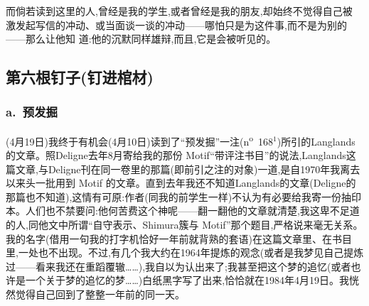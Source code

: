 \pmark{}而倘若读到这里的人,曾经是我的学生,或者曾经是我的朋友,却始终不觉得自己被
激发起写信的冲动、或当面谈一谈的冲动——哪怕只是为这件事,而不是为别的——那么让他知
道:他的沉默同样雄辩,而且,它是会被听见的。

\subsection{第六根钉子(钉进棺材)}   %

\subsubsection{a.\ 预发掘}



(4月19日)我终于有机会(4月10日)读到了“预发掘”一注(n\textsuperscript{o}~168$^{1}$)所引的Langlands的文章。照Deligne去年8月寄给我的那份 Motif“带评注书目”的说法,Langlands这篇文章,与Deligne刊在同一卷里的那篇(即前引之注的对象)一道,是自1970年我离去以来头一批用到 Motif 的文章。直到去年我还不知道Langlands的文章(Deligne的那篇也不知道),这情有可原:作者(同我的前学生一样)不认为有必要给我寄一份抽印本。人们也不禁要问:他何苦费这个神呢——翻一翻他的文章就清楚,我这卑不足道的人,同他文中所谓“自守表示、Shimura簇与 Motif”那个题目,严格说来毫无关系\dmark{}。我的名字(借用一句我的打字机恰好一年前就背熟的套语)在这篇文章里、在书目里,一处也不出现。不过,有几个我大约在1964年提炼的观念(或者是我梦见自己提炼过——看来我还在重蹈覆辙……),我自以为认出来了;我甚至把这个梦的追忆(或者也许是一个关于梦的追忆的梦……)白纸黑字写了出来,恰恰就在1984年4月19日。我恍然觉得自己回到了整整一年前的同一天。

